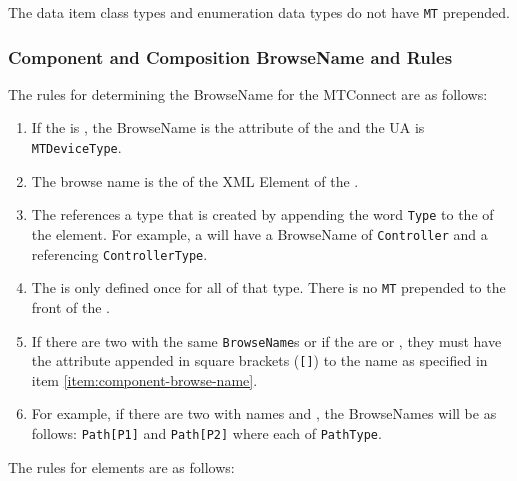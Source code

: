 The data item class types and enumeration data types do not have \texttt{MT} prepended.

\subsubsection{Component and Composition \gls{BrowseName} and  Rules}

The rules for determining the \gls{BrowseName} for the MTConnect  are as follows:

\begin{enumerate}
  \item If the  is , the \gls{BrowseName} is the  attribute of the  and the UA  is \texttt{MTDeviceType}.
  \item The browse name is the  of the XML Element of the . \label{item:component-browse-name}
  \item The  references a type that is created by appending the word \texttt{Type} to the  of the  element. For example, a  will have a \gls{BrowseName} of \texttt{Controller} and a  referencing \texttt{ControllerType}.
  \item The  is only defined once for all  of that type. There is no \texttt{MT} prepended to the front of the  .
  \item If there are two  with the same \texttt{BrowseName}s or if the  are  or , they must have the  attribute appended in square brackets (\texttt{[]}) to the name as specified in item \ref{item:component-browse-name}. 
  \item For example, if there are two   with names  and , the \glspl{BrowseName} will be as follows: \texttt{Path[P1]} and \texttt{Path[P2]} where each  of \texttt{PathType}.
\end{enumerate}

The rules for  elements are as follows:

